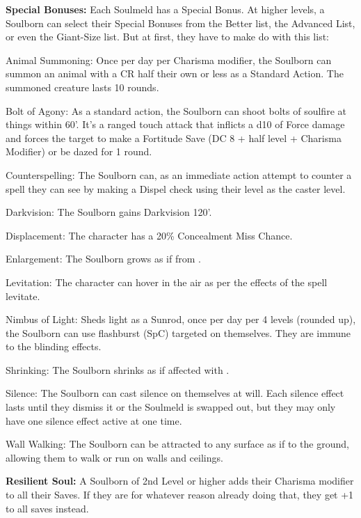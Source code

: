 \textbf{Special Bonuses:} Each Soulmeld has a Special Bonus. At higher levels, a Soulborn can select their Special Bonuses from the Better list, the Advanced List, or even the Giant-Size list. But at first, they have to make do with this list:
\begin{description*}
\item[Animal Summoning:] Once per day per Charisma modifier, the Soulborn can summon an animal with a CR half their own or less as a Standard Action. The summoned creature lasts 10 rounds.
\item[Bolt of Agony:] As a standard action, the Soulborn can shoot bolts of soulfire at things within 60'. It's a ranged touch attack that inflicts a d10 of Force damage and forces the target to make a Fortitude Save (DC 8 + half level + Charisma Modifier) or be dazed for 1 round.
\item[Counterspelling:] The Soulborn can, as an immediate action attempt to counter a spell they can see by making a Dispel check using their level as the caster level.
\item[Darkvision:] The Soulborn gains Darkvision 120'.
\item[Displacement:] The character has a 20\% Concealment Miss Chance.
\item[Enlargement:] The Soulborn grows as if from .
\item[Levitation:] The character can hover in the air as per the effects of the spell levitate.
\item[Nimbus of Light:] Sheds light as a Sunrod, once per day per 4 levels (rounded up), the Soulborn can use flashburst (SpC) targeted on themselves. They are immune to the blinding effects.
\item[Shrinking:] The Soulborn shrinks as if affected with .
\item[Silence:] The Soulborn can cast silence on themselves at will. Each silence effect lasts until they dismiss it or the Soulmeld is swapped out, but they may only have one silence effect active at one time.
\item[Wall Walking:] The Soulborn can be attracted to any surface as if to the ground, allowing them to walk or run on walls and ceilings.
\end{description*}

\textbf{Resilient Soul:} A Soulborn of 2nd Level or higher adds their Charisma modifier to all their Saves. If they are for whatever reason already doing that, they get +1 to all saves instead.


